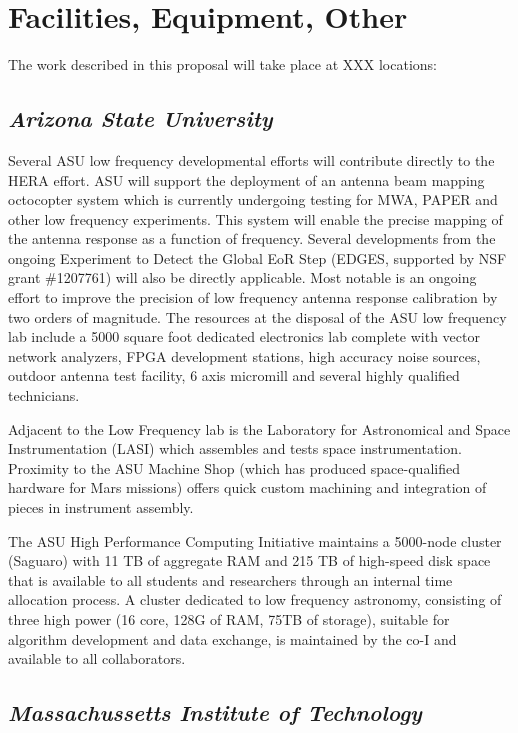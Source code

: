 \documentclass[11pt]{article}
\begin{document}
\pagestyle{empty}

\section*{Facilities, Equipment, Other}

The work described in this proposal will take place at XXX locations: 

\subsection*{\it Arizona State University}

Several ASU low frequency developmental efforts will contribute directly to the HERA effort. ASU will support the deployment of an antenna beam mapping octocopter system which is currently undergoing testing for MWA, PAPER and other low frequency experiments. This system will enable the precise mapping of the antenna response as a function of frequency. Several developments from the ongoing Experiment to Detect the Global EoR Step (EDGES, supported by NSF grant \#1207761) will also be directly applicable.  Most notable is an ongoing effort to improve the precision of low frequency antenna response calibration by two orders of magnitude. The resources at the disposal of the ASU low frequency lab include a 5000 square foot dedicated electronics lab complete with vector network analyzers, FPGA development stations, high accuracy noise sources, outdoor antenna test facility, 6 axis micromill and several highly qualified technicians.

Adjacent to the Low Frequency lab is the Laboratory for Astronomical and Space Instrumentation (LASI) which assembles and tests space instrumentation. Proximity to the ASU Machine Shop (which has produced space-qualified hardware for Mars missions) offers quick custom machining and integration of pieces in instrument assembly. 

The ASU High Performance Computing Initiative maintains a 5000-node cluster (Saguaro) with 11 TB of aggregate RAM and 215 TB of high-speed disk space that is available to all students and researchers through an internal time allocation process. A cluster dedicated to low frequency astronomy, consisting of three high power (16 core, 128G of RAM, 75TB of storage), suitable for algorithm development and data exchange, is maintained by the co-I and available to all collaborators.



\subsection*{\it Massachussetts Institute of Technology}
\end{document}
